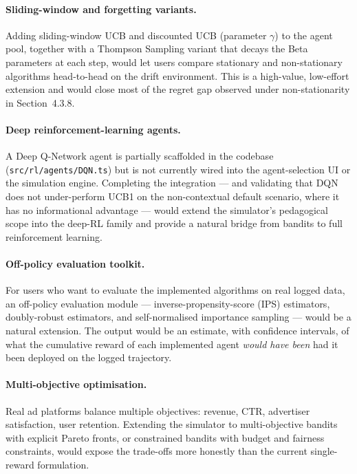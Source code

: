 \paragraph{Sliding-window and forgetting variants.} Adding sliding-window UCB and discounted UCB (parameter $\gamma$) to the agent pool, together with a Thompson Sampling variant that decays the Beta parameters at each step, would let users compare stationary and non-stationary algorithms head-to-head on the drift environment. This is a high-value, low-effort extension and would close most of the regret gap observed under non-stationarity in Section~4.3.8.

\paragraph{Deep reinforcement-learning agents.} A Deep Q-Network agent is partially scaffolded in the codebase (\texttt{src/rl/agents/DQN.ts}) but is not currently wired into the agent-selection UI or the simulation engine. Completing the integration --- and validating that DQN does not under-perform UCB1 on the non-contextual default scenario, where it has no informational advantage --- would extend the simulator's pedagogical scope into the deep-RL family and provide a natural bridge from bandits to full reinforcement learning.

\paragraph{Off-policy evaluation toolkit.} For users who want to evaluate the implemented algorithms on real logged data, an off-policy evaluation module --- inverse-propensity-score (IPS) estimators, doubly-robust estimators, and self-normalised importance sampling --- would be a natural extension. The output would be an estimate, with confidence intervals, of what the cumulative reward of each implemented agent \emph{would have been} had it been deployed on the logged trajectory.

\paragraph{Multi-objective optimisation.} Real ad platforms balance multiple objectives: revenue, CTR, advertiser satisfaction, user retention. Extending the simulator to multi-objective bandits with explicit Pareto fronts, or constrained bandits with budget and fairness constraints, would expose the trade-offs more honestly than the current single-reward formulation.

